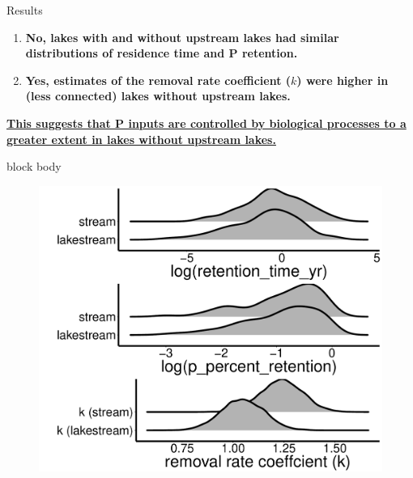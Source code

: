 \documentclass[final,hyperref={pdfpagelabels=false}]{beamer}
\begin{document}
\begin{frame}[t]
\begin{columns}[t]
\begin{column}{.465\textwidth}
\begin{block}{Results}
\begin{enumerate}
\item \textbf{No, lakes with and without upstream lakes had similar distributions of residence time and P retention.}
\vspace{1em}
\item \textbf{Yes, estimates of the removal rate coefficient ($k$) were higher in (less connected) lakes without upstream lakes.}
\end{enumerate}
\vspace{1em}
\large \textbf{\ul{This suggests that P inputs are controlled by biological processes to a greater extent in lakes without upstream lakes.}}

\vspace{1em}
{
\begin{beamercolorbox}[wd=\textwidth,rounded=true]{block body}

\begin{figure}
  \includegraphics[width=30cm]{gleon_poster.pdf}
\end{figure}

\end{beamercolorbox}
}
\vspace{0.5em}
\end{block}


\end{column}
\end{columns}
\end{frame}
\end{document}
